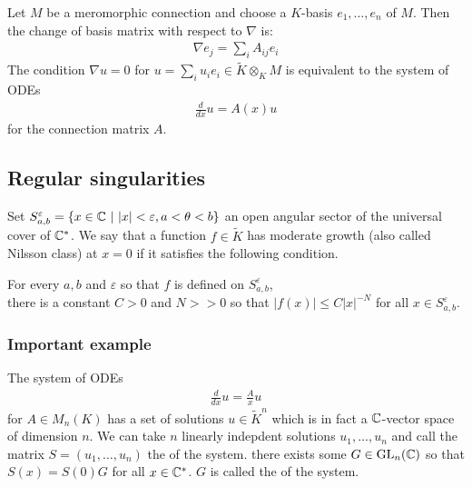 \hfill

Let $M$ be a meromorphic connection and choose a $K$-basis $e_1,\dots,e_n$ of $M$. Then
the change of basis matrix with respect to $\nabla$ is: \begin{align*}
	\nabla e_j = \sum_i A_{ij}e_i
\end{align*} 
The condition $\nabla u = 0$ for $u = \sum_i u_i e_i \in \tilde K \otimes_K M$ is equivalent
to the system of ODEs \begin{align*}
	\frac{d}{dx}u = A(x)u
\end{align*} for the connection matrix $A$.
\subsection{Regular singularities}
Set $S^\varepsilon_{a,b} = \{x\in \mathbb{C}\ \vert \  |x| < \varepsilon, a < \theta < b\}$
an open angular sector of the universal cover of $\mathbb{C}^*$. We say that
a function $f\in \tilde K$ has moderate growth (also called Nilsson class) at $x=0$
if it satisfies the following condition.

\begin{center}
	For every $a,b$ and $\varepsilon$ so that $f$ is defined on $S^\varepsilon_{a,b}$, \\
	there is a constant $C>0$ and $N>>0$ so that $|f(x)|\leq C|x|^{-N}$ for all $x\in S^\varepsilon_{a,b}$.
\end{center}

\subsubsection{Important example}
The system of ODEs \begin{align*}
	\frac{d}{dx}u = \frac{A}{x}u
\end{align*} for $A\in M_n(K)$ has a set of solutions $u\in\tilde K^n$
which is in fact a $\mathbb{C}$-vector space of dimension $n$.
We can take $n$ linearly indepdent solutions $u_1,\dots,u_n$ and call the matrix
$S = (u_1,\dots,u_n)$ the  of the system. 
there exists some $G\in \operatorname{GL}_n(\mathbb{C})$ so that $S(x) = S(0)G$ for all $x\in \mathbb{C}^*$. $G$
is called the  of the system.

